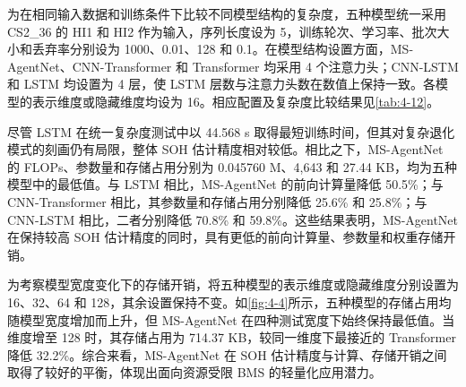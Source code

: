 为在相同输入数据和训练条件下比较不同模型结构的复杂度，五种模型统一采用 CS2\_36 的 HI1 和 HI2 作为输入，序列长度设为 5，训练轮次、学习率、批次大小和丢弃率分别设为 1000、0.01、128 和 0.1。在模型结构设置方面，MS-AgentNet、CNN-Transformer 和 Transformer 均采用 4 个注意力头；CNN-LSTM 和 LSTM 均设置为 4 层，使 LSTM 层数与注意力头数在数值上保持一致。各模型的表示维度或隐藏维度均设为 16。相应配置及复杂度比较结果见\cref{tab:4-12}。

尽管 LSTM 在统一复杂度测试中以 44.568 s 取得最短训练时间，但其对复杂退化模式的刻画仍有局限，整体 SOH 估计精度相对较低。相比之下，MS-AgentNet 的 FLOPs、参数量和存储占用分别为 0.045760 M、4,643 和 27.44 KB，均为五种模型中的最低值。与 LSTM 相比，MS-AgentNet 的前向计算量降低 50.5\%；与 CNN-Transformer 相比，其参数量和存储占用分别降低 25.6\% 和 25.8\%；与 CNN-LSTM 相比，二者分别降低 70.8\% 和 59.8\%。这些结果表明，MS-AgentNet 在保持较高 SOH 估计精度的同时，具有更低的前向计算量、参数量和权重存储开销。

为考察模型宽度变化下的存储开销，将五种模型的表示维度或隐藏维度分别设置为 16、32、64 和 128，其余设置保持不变。如\cref{fig:4-4}所示，五种模型的存储占用均随模型宽度增加而上升，但 MS-AgentNet 在四种测试宽度下始终保持最低值。当维度增至 128 时，其存储占用为 714.37 KB，较同一维度下最接近的 Transformer 降低 32.2\%。综合来看，MS-AgentNet 在 SOH 估计精度与计算、存储开销之间取得了较好的平衡，体现出面向资源受限 BMS 的轻量化应用潜力。




